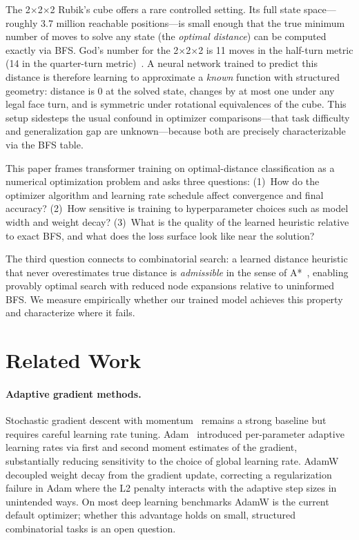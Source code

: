 \documentclass[11pt]{article}
\begin{document}
The 2$\times$2$\times$2 Rubik's cube offers a rare controlled setting.
Its full state space---roughly 3.7 million reachable positions---is small
enough that the true minimum number of moves to solve any state (the
\emph{optimal distance}) can be computed exactly via BFS.
God's number for the 2$\times$2$\times$2 is 11 moves in the half-turn metric (14 in the quarter-turn metric)~\cite{agostinelli2019deepcubea}.
A neural network trained to predict this distance is therefore learning to
approximate a \emph{known} function with structured geometry:
distance is 0 at the solved state, changes by at most one under any legal face
turn, and is symmetric under rotational equivalences of the cube.
This setup sidesteps the usual confound in optimizer comparisons---that task
difficulty and generalization gap are unknown---because both are precisely
characterizable via the BFS table.

This paper frames transformer training on optimal-distance classification as a
numerical optimization problem and asks three questions:
(1)~How do the optimizer algorithm and learning rate schedule affect convergence
and final accuracy?
(2)~How sensitive is training to hyperparameter choices such as model width and
weight decay?
(3)~What is the quality of the learned heuristic relative to exact BFS, and what
does the loss surface look like near the solution?

The third question connects to combinatorial search: a learned distance heuristic
that never overestimates true distance is \emph{admissible} in the sense of
A*~\cite{hart1968astar}, enabling provably optimal search with reduced node
expansions relative to uninformed BFS.
We measure empirically whether our trained model achieves this property and
characterize where it fails.

\section{Related Work}
\label{sec:related}

\paragraph{Adaptive gradient methods.}
Stochastic gradient descent with momentum~\cite{sutskever2013momentum,rumelhart1986backprop}
remains a strong baseline but requires careful learning rate tuning.
Adam~\cite{kingma2015adam} introduced per-parameter adaptive learning rates via
first and second moment estimates of the gradient, substantially reducing
sensitivity to the choice of global learning rate.
AdamW~\cite{loshchilov2019adamw} decoupled weight decay from the gradient update,
correcting a regularization failure in Adam where the L2 penalty interacts with
the adaptive step sizes in unintended ways.
On most deep learning benchmarks AdamW is the current default optimizer; whether
this advantage holds on small, structured combinatorial tasks is an open question.
\end{document}
